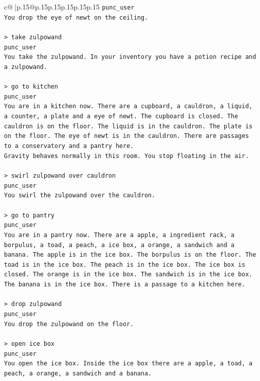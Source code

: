 \documentclass{article}
\begin{document}
{\begin{supertabular}{c@{$\;$}|p{.15\linewidth}@{}p{.15\linewidth}p{.15\linewidth}p{.15\linewidth}p{.15\linewidth}p{.15\linewidth}}
{{{\texttt{punc\_user} \\
\texttt{You drop the eye of newt on the ceiling.} \\
\\ 
\texttt{> take zulpowand} \\
\texttt{punc\_user} \\
\texttt{You take the zulpowand. In your inventory you have a potion recipe and a zulpowand.} \\
\\ 
\texttt{> go to kitchen} \\
\texttt{punc\_user} \\
\texttt{You are in a kitchen now. There are a cupboard, a cauldron, a liquid, a counter, a plate and a eye of newt. The cupboard is closed. The cauldron is on the floor. The liquid is in the cauldron. The plate is on the floor. The eye of newt is in the cauldron. There are passages to a conservatory and a pantry here.} \\
\texttt{Gravity behaves normally in this room. You stop floating in the air.} \\
\\ 
\texttt{> swirl zulpowand over cauldron} \\
\texttt{punc\_user} \\
\texttt{You swirl the zulpowand over the cauldron.} \\
\\ 
\texttt{> go to pantry} \\
\texttt{punc\_user} \\
\texttt{You are in a pantry now. There are a apple, a ingredient rack, a borpulus, a toad, a peach, a ice box, a orange, a sandwich and a banana. The apple is in the ice box. The borpulus is on the floor. The toad is in the ice box. The peach is in the ice box. The ice box is closed. The orange is in the ice box. The sandwich is in the ice box. The banana is in the ice box. There is a passage to a kitchen here.} \\
\\ 
\texttt{> drop zulpowand} \\
\texttt{punc\_user} \\
\texttt{You drop the zulpowand on the floor.} \\
\\ 
\texttt{> open ice box} \\
\texttt{punc\_user} \\
\texttt{You open the ice box. Inside the ice box there are a apple, a toad, a peach, a orange, a sandwich and a banana.} \\
}}}
\end{supertabular}}
\end{document}
